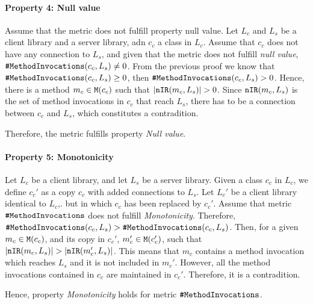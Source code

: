 \paragraph{Property 4: Null value}
Assume that the metric does not fulfill property null value. Let $L_c$ and $L_s$ be a client library and a server library, adn $c_c$ a class in $L_c$. Assume that $c_c$ does not have any connection to $L_s$, and given that the metric does not fulfill \textit{null value}, $\verb|#MethodInvocations|(c_c, L_s) \neq 0$. From the previous proof we know that $\verb|#MethodInvocations|(c_c, L_s) \geq 0$, then  $\verb|#MethodInvocations|(c_c, L_s) > 0$.
Hence, there is a method $m_c \in \verb|M|(c_c)$ such that $|\verb|nIR|(m_c, L_s)| > 0$. Since $\verb|nIR|(m_c, L_s)$ is the set of method invocations in $c_c$ that reach $L_s$, there has to be a connection between $c_c$ and $L_s$, which constitutes a contradition.

Therefore, the metric fulfills property \textit{Null value}.

\paragraph{Property 5: Monotonicity}
Let $L_c$ be a client library, and let $L_s$ be a server library. Given a class $c_c$ in $L_c$, we define $c_c'$ as a copy $c_c$ with added connections to $L_s$. Let $L_c'$ be a client library identical to $L_c$,. but in which $c_c$ has been replaced by $c_c'$. Assume that metric $\verb|#MethodInvocations|$ does not fulfill \textit{Monotonicity}. Therefore, $\verb|#MethodInvocations|(c_c, L_s) > \verb|#MethodInvocations|(c_c, L_s)$.
Then, for a given $m_c \in \verb|M|(c_c)$, and its copy in $c_c'$, $m_c' \in \verb|M|(c_c')$, such that $|\verb|nIR|(m_c, L_s)| > |\verb|nIR|(m_c', L_s)|$. This means that $m_c$ contains a method invocation which reaches $L_s$ and it is not included in $m_c'$. However, all the method invocations contained in $c_c$ are maintained in $c_c'$. Therefore, it is a contradition.

Hence, property \textit{Monotonicity} holds for metric $\verb|#MethodInvocations|$.
